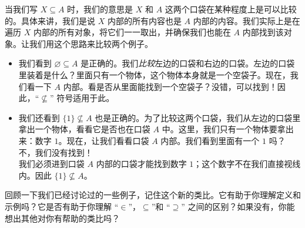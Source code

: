 当我们写 $X \subseteq A$ 时，我们的意思是 $X$ 和 $A$ 这两个口袋在某种程度上是可以比较的。具体来讲，我们是说 $X$ 内部的所有内容也是 $A$ 内部的内容。我们实际上是在遍历 $X$ 内部的所有对象，将它们一一取出，并确保我们也能在 $A$ 内部找到该对象。让我们用这个思路来比较两个例子。

\begin{itemize}
    \item 我们看到 ${\varnothing} \subseteq A$ 是正确的。我们\emph{比较}左边的口袋和右边的口袋。左边的口袋里装着是什么？里面只有一个物体，这个物体本身就是一个空袋子。现在，我们看一下 $A$ 内部。看是否从里面能找到一个空袋子？没错，可以找到！因此，``$\nsubseteq$'' 符号适用于此。
    \item 我们还看到 $\{1\} \nsubseteq A$ 也是正确的。为了比较这两个口袋，我们从左边的口袋里拿出一个物体，看看它是否也在口袋 $A$ 中。这里，我们只有一个物体要拿出来：数字 $1$。现在，让我们看看口袋 $A$ 内部。我们看到里面有一个 $1$ 吗？ 不，我们没有找到！\\
    我们必须进到口袋 $A$ 内部的口袋才能找到数字 $1$；这个数字不在我们直接视线内。因此 $\{1\} \nsubseteq A$。
\end{itemize}

回顾一下我们已经讨论过的一些例子，记住这个新的类比。它有助于你理解定义和示例吗？它是否有助于你理解 ``$\in$''，$\subseteq$''和 ``$\supseteq$'' 之间的区别？如果没有，你能想出其他对你有帮助的类比吗？
